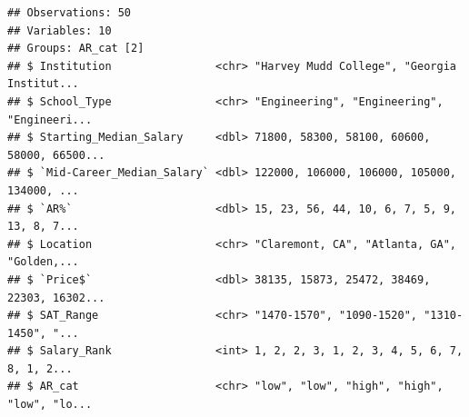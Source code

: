 \documentclass[]{article}
\newenvironment{Shaded}{\begin{snugshade}}{\end{snugshade}}
\newcommand{\KeywordTok}[1]{\textcolor[rgb]{0.13,0.29,0.53}{\textbf{#1}}}
\newcommand{\DataTypeTok}[1]{\textcolor[rgb]{0.13,0.29,0.53}{#1}}
\newcommand{\DecValTok}[1]{\textcolor[rgb]{0.00,0.00,0.81}{#1}}
\newcommand{\StringTok}[1]{\textcolor[rgb]{0.31,0.60,0.02}{#1}}
\newcommand{\OperatorTok}[1]{\textcolor[rgb]{0.81,0.36,0.00}{\textbf{#1}}}
\newcommand{\NormalTok}[1]{#1}
\begin{document}
\begin{Shaded}
\end{Shaded}

\begin{verbatim}
## Observations: 50
## Variables: 10
## Groups: AR_cat [2]
## $ Institution                <chr> "Harvey Mudd College", "Georgia Institut...
## $ School_Type                <chr> "Engineering", "Engineering", "Engineeri...
## $ Starting_Median_Salary     <dbl> 71800, 58300, 58100, 60600, 58000, 66500...
## $ `Mid-Career_Median_Salary` <dbl> 122000, 106000, 106000, 105000, 134000, ...
## $ `AR%`                      <dbl> 15, 23, 56, 44, 10, 6, 7, 5, 9, 13, 8, 7...
## $ Location                   <chr> "Claremont, CA", "Atlanta, GA", "Golden,...
## $ `Price$`                   <dbl> 38135, 15873, 25472, 38469, 22303, 16302...
## $ SAT_Range                  <chr> "1470-1570", "1090-1520", "1310-1450", "...
## $ Salary_Rank                <int> 1, 2, 2, 3, 1, 2, 3, 4, 5, 6, 7, 8, 1, 2...
## $ AR_cat                     <chr> "low", "low", "high", "high", "low", "lo...
\end{verbatim}
\end{document}
